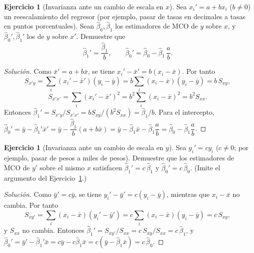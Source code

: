 \documentclass[11pt,a4paper,oneside]{article}
\theoremstyle{plain}
\theoremstyle{definition}
\newtheorem{exercise}[teorema]{Ejercicio}
\begin{document}
\begin{exercise}[Invarianza ante un cambio de escala en $x$]\label{ej:invarianza-x}
Sea $x_i' = a+bx_i$ ($b\neq0$) un reescalamiento del regresor (por
ejemplo, pasar de tasas en decimales a tasas en puntos porcentuales).
Sean $\hat\beta_0,\hat\beta_1$ los estimadores de MCO de $y$ sobre $x$, y
$\hat\beta_0',\hat\beta_1'$ los de $y$ sobre $x'$. Demuestre que
\[
  \hat\beta_1' = \frac{\hat\beta_1}{b}, \qquad
  \hat\beta_0' = \hat\beta_0 - \hat\beta_1\,\frac{a}{b}.
\]
\end{exercise}
\begin{proof}[Solución]
Como $\bar x'=a+b\bar x$, se tiene $x_i'-\bar x' = b(x_i-\bar x)$. Por
tanto
\[
  S_{x'y} = \sum_i (x_i'-\bar x')(y_i-\bar y) = b\sum_i(x_i-\bar x)(y_i-\bar y) = b\,S_{xy},
\]
\[
  S_{x'x'} = \sum_i (x_i'-\bar x')^2 = b^2\sum_i(x_i-\bar x)^2 = b^2 S_{xx}.
\]
Entonces $\hat\beta_1' = S_{x'y}/S_{x'x'} = bS_{xy}/(b^2S_{xx}) =
\hat\beta_1/b$. Para el intercepto,
$\hat\beta_0'=\bar y-\hat\beta_1'\bar x' = \bar y -
\dfrac{\hat\beta_1}{b}(a+b\bar x) = \bar y - \hat\beta_1\bar x -
\hat\beta_1\dfrac{a}{b} = \hat\beta_0 - \hat\beta_1\dfrac{a}{b}$.
\end{proof}

\begin{exercise}[Invarianza ante un cambio de escala en $y$]\label{ej:invarianza-y}
Sea $y_i'=cy_i$ ($c\neq0$; por ejemplo, pasar de pesos a miles de pesos).
Demuestre que los estimadores de MCO de $y'$ sobre el mismo $x$ satisfacen
$\hat\beta_1'=c\,\hat\beta_1$ y $\hat\beta_0'=c\,\hat\beta_0$. (Imite el
argumento del Ejercicio~\ref{ej:invarianza-x}.)
\end{exercise}
\begin{proof}[Solución]
Como $\bar y'=c\bar y$, se tiene $y_i'-\bar y'=c(y_i-\bar y)$, mientras
que $x_i-\bar x$ no cambia. Por tanto
\[
  S_{xy'} = \sum_i(x_i-\bar x)(y_i'-\bar y') = c\sum_i(x_i-\bar x)(y_i-\bar y) = c\,S_{xy},
\]
y $S_{xx}$ no cambia. Entonces $\hat\beta_1' = S_{xy'}/S_{xx} = c\,S_{xy}/S_{xx} = c\,\hat\beta_1$,
y $\hat\beta_0' = \bar y'-\hat\beta_1'\bar x = c\bar y - c\hat\beta_1\bar x
= c(\bar y-\hat\beta_1\bar x) = c\,\hat\beta_0$.
\end{proof}
\end{document}
